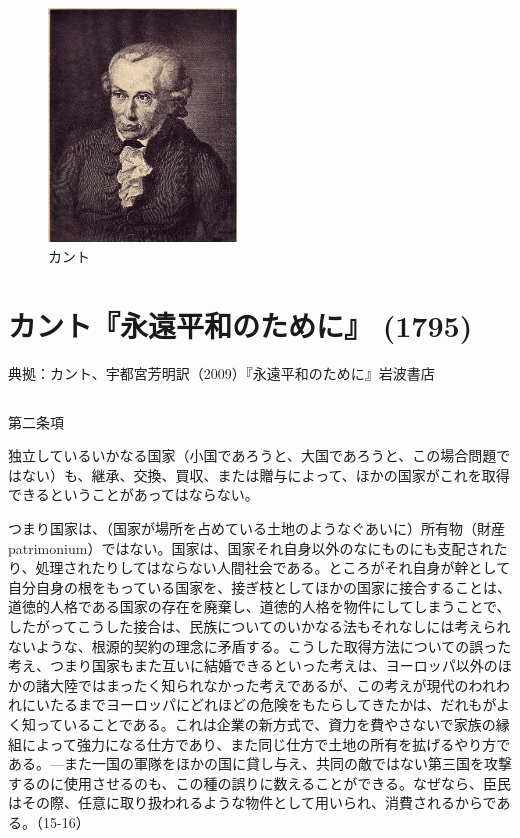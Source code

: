      \begin{figure}[htbp]
       \centering
         \includegraphics[width=50mm]{images/Kant.jpg}
       \caption{カント}
     \end{figure}



\section{カント『永遠平和のために』 (1795)}





典拠：カント、宇都宮芳明訳（2009）『永遠平和のために』岩波書店

\subsection{}


第二条項

独立しているいかなる国家（小国であろうと、大国であろうと、この場合問題ではない）も、継承、交換、買収、または贈与によって、ほかの国家がこれを取得できるということがあってはならない。

つまり国家は、（国家が場所を占めている土地のようなぐあいに）所有物（財産patrimonium）ではない。国家は、国家それ自身以外のなにものにも支配されたり、処理されたりしてはならない人間社会である。ところがそれ自身が幹として自分自身の根をもっている国家を、接ぎ枝としてほかの国家に接合することは、道徳的人格である国家の存在を廃棄し、道徳的人格を物件にしてしまうことで、したがってこうした接合は、民族についてのいかなる法もそれなしには考えられないような、根源的契約の理念に矛盾する。こうした取得方法についての誤った考え、つまり国家もまた互いに結婚できるといった考えは、ヨーロッパ以外のほかの諸大陸ではまったく知られなかった考えであるが、この考えが現代のわれわれにいたるまでヨーロッパにどれほどの危険をもたらしてきたかは、だれもがよく知っていることである。これは企業の新方式で、資力を費やさないで家族の縁組によって強力になる仕方であり、また同じ仕方で土地の所有を拡げるやり方である。{\——}また一国の軍隊をほかの国に貸し与え、共同の敵ではない第三国を攻撃するのに使用させるのも、この種の誤りに数えることができる。なぜなら、臣民はその際、任意に取り扱われるような物件として用いられ、消費されるからである。（15-16）

